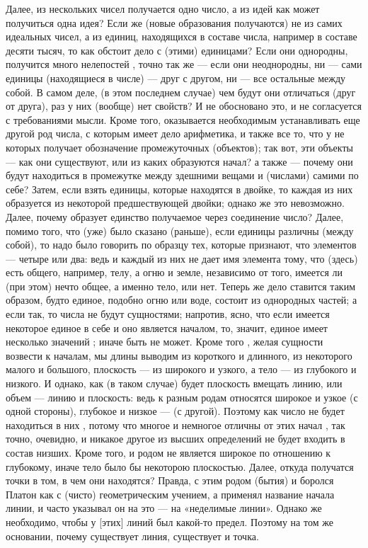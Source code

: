 \documentclass{article}
\begin{document}
Далее, из нескольких чисел получается одно число, а из идей
\footnotemark[29]
как может получиться одна идея?
\footnotemark[30]
Если же (новые образования получаются) не из самих идеальных чисел, а из единиц, находящихся в составе числа, например в составе десяти тысяч, то как обстоит дело с (этими) единицами? Если они однородны, получится много нелепостей
\footnotemark[31]
, точно так же — если они неоднородны, ни — сами единицы (находящиеся в числе) — друг с другом, ни — все остальные между собой.
\footnotemark[32]
В самом деле, (в этом последнем случае) чем будут они отличаться (друг от друга), раз у них (вообще) нет свойств? И не обосновано это, и не согласуется с требованиями мысли. Кроме того, оказывается необходимым устанавливать еще другой род числа, с которым имеет дело арифметика, и также все то, что у не которых получает обозначение промежуточных (объектов); так вот, эти объекты — как они существуют, или из каких образуются начал? а также — почему они будут находиться в промежутке между здешними вещами и (числами) самими по себе? Затем, если взять единицы, которые находятся в двойке, то каждая из них образуется из некоторой предшествующей двойки;
\footnotemark[33]
однако же это невозможно. Далее, почему образует единство получаемое через соединение число?
\footnotemark[34]
Далее, помимо того, что (уже) было сказано (раньше), если единицы различны (между собой), то надо было говорить по образцу тех, которые признают, что элементов — четыре или два: ведь и каждый из них не дает имя элемента тому, что (здесь) есть общего, например, телу, а огню и земле, независимо от того, имеется ли (при этом) нечто общее, а именно тело, или нет. Теперь же дело ставится таким образом, будто единое, подобно огню или воде, состоит из однородных частей; а если так, то числа не будут сущностями; напротив, ясно, что если имеется некоторое единое в себе и оно является началом, то, значит, единое имеет несколько значений
\footnotemark[35]
; иначе быть не может. Кроме того
\footnotemark[36]
, желая сущности возвести к началам, мы
\footnotemark[37]
длины
\footnotemark[38]
выводим из короткого и длинного, из некоторого малого и большого, плоскость — из широкого и узкого, а тело — из глубокого и низкого.
\footnotemark[39]
И однако, как (в таком случае)
\footnotemark[40]
будет плоскость вмещать линию, или объем — линию и плоскость: ведь к разным родам относятся широкое и узкое (с одной стороны), глубокое и низкое — (с другой). Поэтому как число не будет находиться в них
\footnotemark[41]
, потому что многое и немногое отличны от этих начал
\footnotemark[42]
, так точно, очевидно, и никакое другое из высших определений не будет входить в состав низших. Кроме того, и родом не является широкое по отношению к глубокому, иначе тело было бы некоторою плоскостью. Далее, откуда получатся точки в том, в чем они находятся? Правда, с этим родом (бытия) и боролся Платон как с (чисто) геометрическим учением, а применял название начала линии, и часто указывал он на это — на «неделимые линии».
\footnotemark[43]
Однако же необходимо, чтобы у [этих] линий был какой-то предел. Поэтому на том же основании, почему существует линия, существует и точка.
\end{document}
